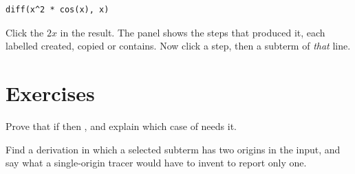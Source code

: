 \begin{trybox}
\begin{verbatim}
diff(x^2 * cos(x), x)
\end{verbatim}
  Click the $2x$ in the result. The panel shows the steps that produced it, each labelled
  created, copied or contains. Now click a step, then a subterm of \emph{that} line.
\end{trybox}

\section{Exercises}

\begin{exercisebox}[Disjointness]
  Prove that if  then , and explain which case
  of  needs it.
\end{exercisebox}

\begin{exercisebox}
  Find a derivation in which a selected subterm has two origins in the input, and say what a
  single-origin tracer would have to invent to report only one.
\end{exercisebox}
